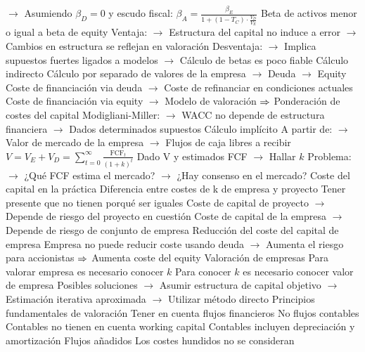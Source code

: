 \documentclass{nuevotema}
\begin{document}
\begin{esquemal}
				\4[] $\to$ Asumiendo $\beta_D=0$ y escudo fiscal:
				\4[] \quad $\beta_A = \frac{\beta_E}{1+(1-T_C) \cdot \frac{V_D}{V_E}}$
				\4[] Beta de activos menor o igual a beta de equity
				\4[] Ventaja:
				\4[] $\to$ Estructura del capital no induce a error
				\4[] $\to$ Cambios en estructura se reflejan en valoración
				\4[] Desventaja:
				\4[] $\to$ Implica supuestos fuertes ligados a modelos
				\4[] $\to$ Cálculo de betas es poco fiable
				\4 Cálculo indirecto
				\4[] Cálculo por separado de valores de la empresa
				\4[] $\to$ Deuda
				\4[] $\to$ Equity
				\4[] Coste de financiación via deuda
				\4[] $\to$ Coste de refinanciar en condiciones actuales
				\4[] Coste de financiación via equity
				\4[] $\to$ Modelo de valoración
				\4[] $\Rightarrow$ Ponderación de costes del capital
				\4[] 
				\4[] Modigliani-Miller:
				\4[] $\to$ WACC no depende de estructura financiera
				\4[] $\to$ Dados determinados supuestos
				\4 Cálculo implícito
				\4[] A partir de:
				\4[] $\to$ Valor de mercado de la empresa
				\4[] $\to$ Flujos de caja libres a recibir
				\4[] $V = V_E + V_D = \sum_{t=0}^\infty \frac{\text{FCF}_t}{(1+k)^t}$
				\4[] Dado V y estimados FCF
				\4[] $\to$ Hallar $k$
				\4[] Problema:
				\4[] $\to$ ¿Qué FCF estima el mercado?
				\4[] $\to$ ¿Hay consenso en el mercado?
			\3 Coste del capital en la práctica
				\4 Diferencia entre costes de k de empresa y proyecto
				\4[] Tener presente que no tienen porqué ser iguales
				\4[] Coste de capital de proyecto
				\4[] $\to$ Depende de riesgo del proyecto en cuestión
				\4[] Coste de capital de la empresa
				\4[] $\to$ Depende de riesgo de conjunto de empresa
				\4 Reducción del coste del capital de empresa
				\4[] Empresa no puede reducir coste usando deuda
				\4[] $\to$ Aumenta el riesgo para accionistas
				\4[] $\Rightarrow$ Aumenta coste del equity
				\4 Valoración de empresas
				\4[] Para valorar empresa es necesario conocer $k$
				\4[] Para conocer $k$ es necesario conocer valor de empresa
				\4[] Posibles soluciones
				\4[] $\to$ Asumir estructura de capital objetivo
				\4[] $\to$ Estimación iterativa aproximada
				\4[] $\to$ Utilizar método directo
	\1 
		\2 Principios fundamentales de valoración
			\3 Tener en cuenta flujos financieros
				\4 No flujos contables
				\4 Contables no tienen en cuenta working capital
				\4 Contables incluyen depreciación y amortización
			\3 Flujos añadidos
				\4 Los costes hundidos no se consideran

\end{esquemal}
\end{document}
